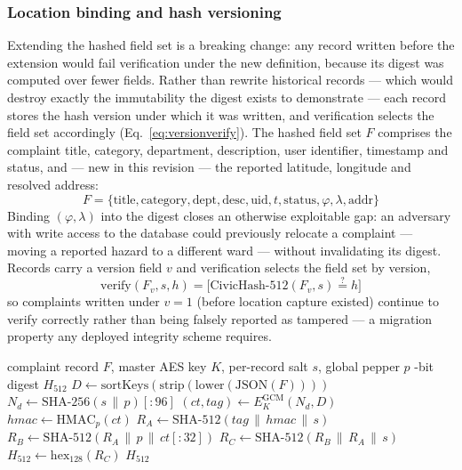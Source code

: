\documentclass[conference]{IEEEtran}
\begin{document}
\subsubsection{Location binding and hash versioning}
Extending the hashed field set is a breaking change: any record written before the extension would fail verification under the new definition, because its digest was computed over fewer fields. Rather than rewrite historical records --- which would destroy exactly the immutability the digest exists to demonstrate --- each record stores the hash version under which it was written, and verification selects the field set accordingly (Eq.~\ref{eq:versionverify}).
The hashed field set $F$ comprises the complaint title, category, department, description, user identifier, timestamp and status, and --- new in this revision --- the reported latitude, longitude and resolved address:
\begin{equation}
F = \{\text{title}, \text{category}, \text{dept}, \text{desc}, \text{uid}, t, \text{status}, \varphi, \lambda, \text{addr}\}
\label{eq:fieldset}
\end{equation}
Binding $(\varphi, \lambda)$ into the digest closes an otherwise exploitable gap: an adversary with write access to the database could previously relocate a complaint --- moving a reported hazard to a different ward --- without invalidating its digest. Records carry a version field $v$ and verification selects the field set by version,
\begin{equation}
\mathrm{verify}(F_v, s, h) = \big[\mathrm{CivicHash}\text{-}512(F_v, s) \overset{?}{=} h\big]
\label{eq:versionverify}
\end{equation}
so complaints written under $v=1$ (before location capture existed) continue to verify correctly rather than being falsely reported as tampered --- a migration property any deployed integrity scheme requires.

\begin{algorithm}[t]
\caption{CivicHash-512 Digest Computation}
\label{alg:civichash}
\begin{algorithmic}[1]
\Require complaint record $F$, master AES key $K$, per-record salt $s$, global pepper $p$
-bit digest $H_{512}$
\State $D \gets \mathrm{sortKeys}(\mathrm{strip}(\mathrm{lower}(\mathrm{JSON}(F))))$ 
\State $N_d \gets \mathrm{SHA\text{-}256}(s \,\|\, p)[:96]$ 
\State $(ct, tag) \gets E^{\mathrm{GCM}}_K(N_d, D)$ 
\State $hmac \gets \mathrm{HMAC}_p(ct)$ 
\State $R_A \gets \mathrm{SHA\text{-}512}(tag \,\|\, hmac \,\|\, s)$ 
\State $R_B \gets \mathrm{SHA\text{-}512}(R_A \,\|\, p \,\|\, ct[:32])$ 
\State $R_C \gets \mathrm{SHA\text{-}512}(R_B \,\|\, R_A \,\|\, s)$ 
\State $H_{512} \gets \mathrm{hex}_{128}(R_C)$ 
\State \Return $H_{512}$
\end{algorithmic}
\end{algorithm}
\end{document}
